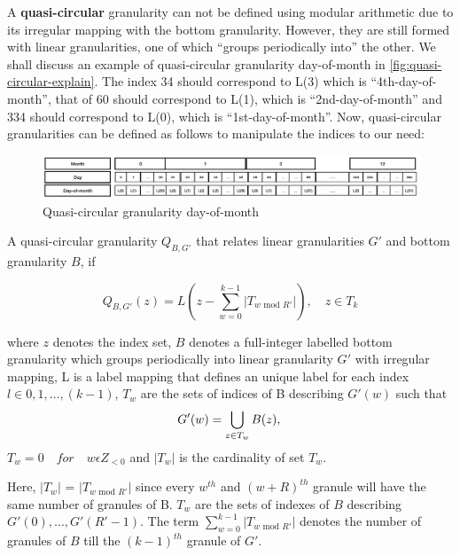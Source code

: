 \documentclass[10pt,a4paper,]{article}
\begin{document}
A \textbf{quasi-circular} granularity can not be defined using modular arithmetic due to its irregular mapping with the bottom granularity. However, they are still formed with linear granularities, one of which \enquote{groups periodically into} the other. We shall discuss an example of quasi-circular granularity day-of-month in \autoref{fig:quasi-circular-explain}. The index 34 should correspond to L(3) which is \enquote{4th-day-of-month}, that of 60 should correspond to L(1), which is \enquote{2nd-day-of-month} and 334 should correspond to L(0), which is \enquote{1st-day-of-month}. Now, quasi-circular granularities can be defined as follows to manipulate the indices to our need:

\begin{figure}
\includegraphics[width=1\linewidth]{Figs/quasi-circular-explain} \caption{Quasi-circular granularity day-of-month}\label{fig:quasi-circular-explain}
\end{figure}

\begin{definition}\label{quasicircular}
A quasi-circular granularity $Q_{B, G'}$ that relates linear granularities $G'$ and bottom granularity $B$, if

\begin{equation}\label{eq:eq6}
Q_{B, G'}(z) = L(z - \sum_{w=0}^{k-1}\vert T_{w \text{~mod~}R'} \vert), \quad z \in T_k
\end{equation}

where
$z$ denotes the index set,
$B$ denotes a full-integer labelled bottom granularity which groups periodically into linear granularity $G'$ with irregular mapping, {L} is a label mapping that defines an unique label for each index $l \in {0,1,\dots, (k-1)}$, $T_w$ are the sets of indices of B describing $G'(w)$ such that 
\begin{equation}
G'(w) = \bigcup_{z \in T_w}B(z),\\
\end{equation}
$T_w = 0 \quad for \quad w\epsilon Z_{<0}$ and $\vert T_w \vert$ is the cardinality of set $T_w$.
\end{definition}

Here, \(\vert T_w \vert\) = \(\vert T_{w\text{~mod~}R'} \vert\) since every \(w^{th}\) and \((w+R)^{th}\) granule will have the same number of granules of B. \(T_w\) are the sets of indexes of \(B\) describing \(G'(0), . . . , G'(R'- 1)\). The term \(\sum_{w=0}^{k-1}\vert T_{w \text{~mod~}R'}\vert\) denotes the number of granules of \(B\) till the \((k-1)^{th}\) granule of \(G'\).
\end{document}

